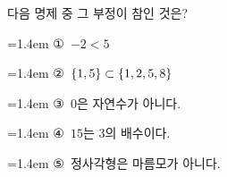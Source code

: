 다음 명제 중 그 부정이 참인 것은?
\par\medskip\par\noindent\hangindent=1.4em {\small ①}\ $-2<5$\par\noindent\hangindent=1.4em {\small ②}\ $\{1{,}\mkern3mu\mathopen{}5\}\subset\{1{,}\mkern3mu\mathopen{}2{,}\mkern3mu\mathopen{}5{,}\mkern3mu\mathopen{}8\}$\par\noindent\hangindent=1.4em {\small ③}\ $0$은 자연수가 아니다.\par\noindent\hangindent=1.4em {\small ④}\ $15$는 $3$의 배수이다.\par\noindent\hangindent=1.4em {\small ⑤}\ 정사각형은 마름모가 아니다.\par\medskip
